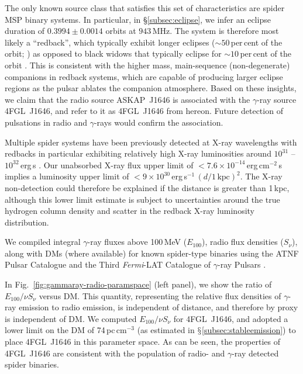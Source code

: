 \documentclass[fleqn,usenatbib]{mnras}
\newcommand{\fermi}{\textit{Fermi}}
\newcommand{\blinky}{{4FGL}~J1646}
\newcommand{\blinkyaskap}{{ASKAP}~J1646}
\begin{document}
The only known source class that satisfies this set of characteristics are spider MSP binary systems. In particular, in \S\ref{subsec:eclipse}, we infer an eclipse duration of $0.3994\pm{0.0014}$ orbits at $943$\,MHz. The system is therefore most likely a ``redback'', which typically exhibit longer eclipses ($\sim 50$\,per\,cent of the orbit; \citealp{2021ApJ...909....6D,2016ApJ...819...34C}) as opposed to black widows that typically eclipse for $\sim 10$\,per\,cent of the orbit \citep[e.g.][]{2020MNRAS.494.2948P}. This is consistent with the higher mass, main-sequence (non-degenerate) companions in redback systems, which are capable of producing larger eclipse regions as the pulsar ablates the companion atmosphere. Based on these insights, we claim that the radio source \blinkyaskap{} is associated with the $\gamma$-ray source \blinky{}, and refer to it as \blinky{} from hereon. Future detection of pulsations in radio and $\gamma$-rays would confirm the association.%

{Multiple spider systems have been previously detected at X-ray wavelengths  with redbacks in particular exhibiting relatively high X-ray luminosities around $10^{31}$ -- $10^{32}$\,erg\,s \citep{2022MNRAS.511.5964Z,2018ApJ...864...23L}. Our unabsorbed X-ray flux upper limit of $<7.6\times 10^{-14}$\,erg\,cm$^{-2}$\,s implies a luminosity upper limit of $<9\times 10^{30}$\,erg\,s$^{-1}$\,$(d / 1\,\text{kpc})^{2}$. The X-ray non-detection could therefore be explained if the distance is greater than 1\,kpc, although this lower limit estimate is subject to uncertainties around the true hydrogen column density and scatter in the redback X-ray luminosity distribution.}

We compiled integral $\gamma$-ray fluxes above 100\,MeV ($E_{100}$), radio flux densities ($S_\nu$), along with DMs (where available) for known spider-type binaries using the ATNF Pulsar Catalogue \citep{2005AJ....129.1993M} and the {Third \textit{Fermi}-LAT Catalogue of $\gamma$-ray Pulsars \citep[][hereafter \fermi{} 3PC]{2023arXiv230711132S}}.%

In Fig.~\ref{fig:gammaray-radio-paramspace} (left panel), we show the ratio of $E_{100}/\nu S_\nu$ versus DM. This quantity, representing the relative flux densities of $\gamma$-ray emission to radio emission, is independent of distance, and therefore by proxy is independent of DM. We computed $E_{100}/\nu S_\nu$ for \blinky{}, and adopted a lower limit on the DM of 74\,pc\,cm$^{-3}$ (as estimated in $\mathsection$\ref{subsec:stableemission}) to place \blinky{} in this parameter space. As can be seen, the properties of \blinky{} are consistent with the population of radio- and $\gamma$-ray detected spider binaries. 
\end{document}
